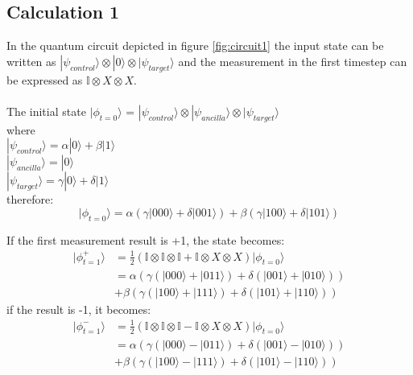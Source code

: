 \subsection{Calculation 1}
\label{sec:calc1}

In the quantum circuit depicted in figure \ref{fig:circuit1} the input
state can be written as $|\psi_{control}\rangle \otimes |0\rangle 
\otimes |\psi_{target}\rangle$ and the measurement in the first 
timestep can be expressed as $\mathbb{I}\otimes X \otimes X$.\\
\\
The initial state $|\phi_{t=0}\rangle$ = $|\psi_{control}\rangle \otimes |\psi_{ancilla}\rangle \otimes
|\psi_{target}\rangle$\\
where\\
$|\psi_{control}\rangle = \alpha|0\rangle+\beta|1\rangle$
\\
$|\psi_{ancilla}\rangle = |0\rangle$
\\
$|\psi_{target}\rangle = \gamma|0\rangle+\delta|1\rangle$
\\
therefore:
\begin{equation}
|\phi_{t=0}\rangle = \alpha \left( \gamma |000\rangle + \delta |001\rangle\right)+
\beta \left( \gamma |100\rangle + \delta |101\rangle \right)
\end{equation}

If the first measurement result is +1, the state becomes:
\begin{align*}
	|\phi^{+}_{t=1}\rangle 
	&= \frac{1}{2}\left(\mathbb{I}\otimes\mathbb{I}\otimes\mathbb{I}+
	\mathbb{I}\otimes X \otimes X\right)|\phi_{t=0}\rangle\\
	&= \alpha \left( 
	\gamma \left( |000\rangle + |011\rangle \right) +
	\delta \left( |001\rangle + |010\rangle \right) \right) \\
	&+ \beta \left(
	\gamma \left( |100\rangle + |111\rangle \right) +
	\delta \left( |101\rangle + |110\rangle \right) \right)
\end{align*}
if the result is -1, it becomes:
\begin{align*}
	|\phi^{-}_{t=1}\rangle 
	&= \frac{1}{2}\left(\mathbb{I}\otimes\mathbb{I}\otimes\mathbb{I}-
	\mathbb{I}\otimes X \otimes X\right)|\phi_{t=0}\rangle\\
	&= \alpha \left( 
	\gamma \left( |000\rangle - |011\rangle \right) +
	\delta \left( |001\rangle - |010\rangle \right) \right) \\
	&+ \beta \left(
	\gamma \left( |100\rangle - |111\rangle \right) +
	\delta \left( |101\rangle - |110\rangle \right) \right)
\end{align*}

